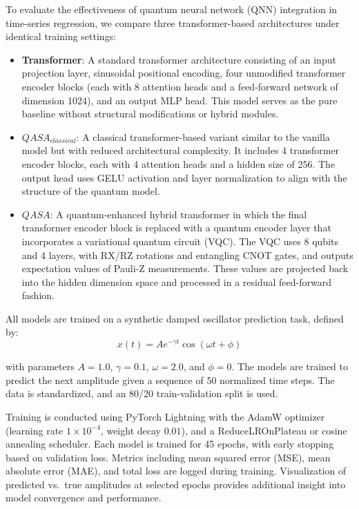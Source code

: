 \documentclass[conference]{IEEEtran}
\begin{document}
To evaluate the effectiveness of quantum neural network (QNN) integration in time-series regression, we compare three transformer-based architectures under identical training settings:

\begin{itemize}
    \item \textbf{Transformer}: A standard transformer architecture consisting of an input projection layer, sinusoidal positional encoding, four unmodified transformer encoder blocks (each with 8 attention heads and a feed-forward network of dimension 1024), and an output MLP head. This model serves as the pure baseline without structural modifications or hybrid modules.
    
    \item \textbf{$QASA_{classical}$}: A classical transformer-based variant similar to the vanilla model but with reduced architectural complexity. It includes 4 transformer encoder blocks, each with 4 attention heads and a hidden size of 256. The output head uses GELU activation and layer normalization to align with the structure of the quantum model.
    
    \item \textbf{$QASA$}: A quantum-enhanced hybrid transformer in which the final transformer encoder block is replaced with a quantum encoder layer that incorporates a variational quantum circuit (VQC). The VQC uses 8 qubits and 4 layers, with RX/RZ rotations and entangling CNOT gates, and outputs expectation values of Pauli-Z measurements. These values are projected back into the hidden dimension space and processed in a residual feed-forward fashion.
\end{itemize}

All models are trained on a synthetic damped oscillator prediction task, defined by:
\begin{equation}
    x(t) = A e^{-\gamma t} \cos(\omega t + \phi)
\end{equation}

with parameters $A = 1.0$, $\gamma = 0.1$, $\omega = 2.0$, and $\phi = 0$. The models are trained to predict the next amplitude given a sequence of 50 normalized time steps. The data is standardized, and an 80/20 train-validation split is used.

Training is conducted using PyTorch Lightning with the AdamW optimizer (learning rate $1 \times 10^{-4}$, weight decay $0.01$), and a ReduceLROnPlateau or cosine annealing scheduler. Each model is trained for 45 epochs, with early stopping based on validation loss. Metrics including mean squared error (MSE), mean absolute error (MAE), and total loss are logged during training. Visualization of predicted vs.\ true amplitudes at selected epochs provides additional insight into model convergence and performance.
\end{document}
